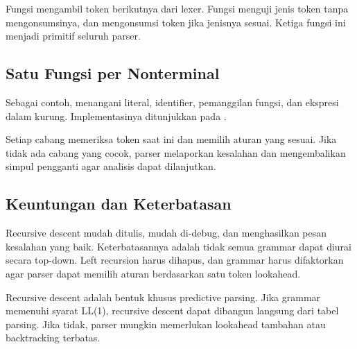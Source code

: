 Fungsi  mengambil token berikutnya dari lexer.
Fungsi  menguji jenis token tanpa mengonsumsinya, dan
 mengonsumsi token jika jenisnya sesuai. Ketiga fungsi
ini menjadi primitif seluruh parser.

\subsection{Satu Fungsi per Nonterminal}

Sebagai contoh,  menangani literal, identifier,
pemanggilan fungsi, dan ekspresi dalam kurung. Implementasinya
ditunjukkan pada .


Setiap cabang memeriksa token saat ini dan memilih aturan yang
sesuai. Jika tidak ada cabang yang cocok, parser melaporkan kesalahan
dan mengembalikan simpul pengganti agar analisis dapat dilanjutkan.

\subsection{Keuntungan dan Keterbatasan}

Recursive descent mudah ditulis, mudah di-debug, dan menghasilkan
pesan kesalahan yang baik. Keterbatasannya adalah tidak semua
grammar dapat diurai secara top-down. Left recursion harus dihapus,
dan grammar harus difaktorkan agar parser dapat memilih aturan
berdasarkan satu token lookahead.

\begin{infobox}
Recursive descent adalah bentuk khusus predictive parsing. Jika
grammar memenuhi syarat LL(1), recursive descent dapat dibangun
langsung dari tabel parsing. Jika tidak, parser mungkin memerlukan
lookahead tambahan atau backtracking terbatas.
\end{infobox}
